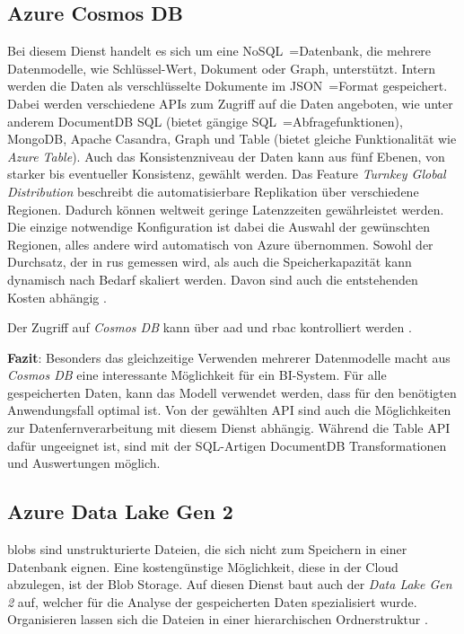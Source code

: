 \subsection{Azure Cosmos DB} \label{sec:grundlagen:azure_dienste:cosmosDB}
Bei diesem Dienst handelt es sich um eine NoSQL~=Datenbank, die mehrere Datenmodelle, wie Schlüssel-Wert, Dokument oder Graph, unterstützt. Intern werden die Daten als verschlüsselte Dokumente im JSON~=Format gespeichert. Dabei werden verschiedene APIs zum Zugriff auf die Daten angeboten, wie unter anderem DocumentDB SQL (bietet gängige SQL~=Abfragefunktionen), MongoDB, Apache Casandra, Graph und Table (bietet gleiche Funktionalität wie \textit{Azure Table}). Auch das Konsistenzniveau der Daten kann aus fünf Ebenen, von starker bis eventueller Konsistenz, gewählt werden. Das Feature \textit{Turnkey Global Distribution} beschreibt die automatisierbare Replikation über verschiedene Regionen. Dadurch können weltweit geringe Latenzzeiten gewährleistet werden. Die einzige notwendige Konfiguration ist dabei die Auswahl der gewünschten Regionen, alles andere wird automatisch von Azure übernommen. Sowohl der Durchsatz, der in \acp{ru} gemessen wird, als auch die Speicherkapazität kann dynamisch nach Bedarf skaliert werden. Davon sind auch die entstehenden Kosten abhängig \cite{guay_paz_microsoft_2018}\cite{mrzyglod_hands-azure_2018}.

Der Zugriff auf \textit{Cosmos DB} kann über \ac{aad} und \ac{rbac} kontrolliert werden \cite{weiss_azure_2021}.

\textbf{Fazit}: Besonders das gleichzeitige Verwenden mehrerer Datenmodelle macht aus \textit{Cosmos DB} eine interessante Möglichkeit für ein BI-System. Für alle gespeicherten Daten, kann das Modell verwendet werden, dass für den benötigten Anwendungsfall optimal ist. Von der gewählten API sind auch die Möglichkeiten zur Datenfernverarbeitung mit diesem Dienst abhängig. Während die Table API dafür ungeeignet ist, sind mit der SQL-Artigen DocumentDB Transformationen und Auswertungen möglich.


\subsection{Azure Data Lake Gen 2} \label{sec:grundlagen:azure_dienste:dataLake}
\acp{blob} sind unstrukturierte Dateien, die sich nicht zum Speichern in einer Datenbank eignen. Eine kostengünstige Möglichkeit, diese in der Cloud abzulegen, ist der Blob Storage. Auf diesen Dienst baut auch der \textit{Data Lake Gen 2} auf, welcher für die Analyse der gespeicherten Daten spezialisiert wurde. Organisieren lassen sich die Dateien in einer hierarchischen Ordnerstruktur \cite{soh_microsoft_2020}.

